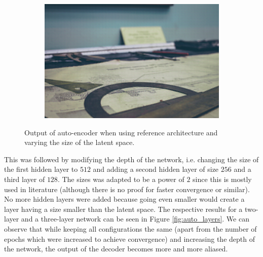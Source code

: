 \documentclass{article}
\begin{document}
\begin{figure}
\begin{subfigure}[b]{0.49 \textwidth}
    \includegraphics[width=\textwidth]{Images/autoencoder/reconstructed/500/test3_90.png}
    \end{subfigure}
    \caption{Output of auto-encoder when using reference architecture and varying the size of the latent space.}
    \label{fig:auto_latent}
\end{figure}

This was followed by modifying the depth of the network, i.e. changing the size of the first hidden layer to $512$ and adding a second hidden layer of size $256$ and a third layer of $128$. The sizes was adapted to be a power of $2$ since this is mostly used in literature (although there is no proof for faster convergence or similar). No more hidden layers were added because going even smaller would create a layer having a size smaller than the latent space. The respective results for a two-layer and a three-layer network can be seen in Figure \ref{fig:auto_layers}. We can observe that while keeping all configurations the same (apart from the number of epochs which were increased to achieve convergence) and increasing the depth of the network, the output of the decoder becomes more and more aliased.\\
\end{document}
